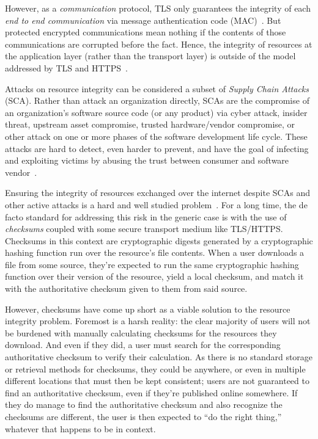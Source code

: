 However, as a \textit{communication} protocol, TLS only guarantees the integrity
of each \textit{end to end communication} via message authentication code
(MAC)~\cite{TLS1.2}. But protected encrypted communications mean nothing if the
contents of those communications are corrupted before the fact. Hence, the
integrity of resources at the application layer (rather than the transport
layer) is outside of the model addressed by TLS and HTTPS~\cite{TLS1.2, HTTPS}.

Attacks on resource integrity can be considered a subset of \emph{Supply Chain
Attacks} (SCA). Rather than attack an organization directly, SCAs are the
compromise of an organization's software source code (or any product) via cyber
attack, insider threat, upstream asset compromise, trusted hardware/vendor
compromise, or other attack on one or more phases of the software development
life cycle. These attacks are hard to detect, even harder to prevent, and have
the goal of infecting and exploiting victims by abusing the trust between
consumer and software vendor~\cite{SCA}.

Ensuring the integrity of resources exchanged over the internet despite SCAs and
other active attacks is a hard and well studied problem~\cite{MD5Header,
HTTP1.1, HTTPS, SRI, LF, OpenPGP1, DNSSEC, PKI}. For a long time, the de facto
standard for addressing this risk in the generic case is with the use of
\textit{checksums} coupled with some secure transport medium like TLS/HTTPS.
Checksums in this context are cryptographic digests generated by a cryptographic
hashing function run over the resource's file contents. When a user downloads a
file from some source, they're expected to run the same cryptographic hashing
function over their version of the resource, yield a local checksum, and match
it with the authoritative checksum given to them from said source.

However, checksums have come up short as a viable solution to the resource
integrity problem. Foremost is a harsh reality: the clear majority of users will
not be burdened with manually calculating checksums for the resources they
download. And even if they did, a user must search for the corresponding
authoritative checksum to verify their calculation. As there is no standard
storage or retrieval methods for checksums, they could be anywhere, or even in
multiple different locations that must then be kept consistent; users are not
guaranteed to find an authoritative checksum, even if they're published online
somewhere. If they do manage to find the authoritative checksum and also
recognize the checksums are different, the user is then expected to ``do the
right thing,'' whatever that happens to be in context.

